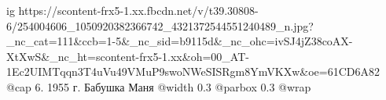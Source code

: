  
 
 
 
 

\ifcmt
  ig https://scontent-frx5-1.xx.fbcdn.net/v/t39.30808-6/254004606_1050920382366742_4321372544551240489_n.jpg?_nc_cat=111&ccb=1-5&_nc_sid=b9115d&_nc_ohc=ivSJ4jZ38coAX-XtXwS&_nc_ht=scontent-frx5-1.xx&oh=00_AT-1Ec2UIMTqqn3T4uVu49VMuP9swoNWeSISRgm8YmVKXw&oe=61CD6A82
  @cap 6. 1955 г. Бабушка Маня
  @width 0.3
  @parbox 0.3
	@wrap \parpic[r]
\fi
